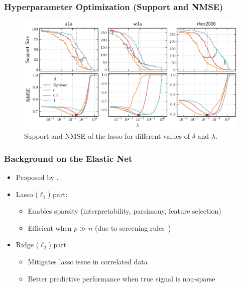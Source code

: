 \documentclass[aspectratio=1610,onlytextwidth]{beamer}
\begin{document}
\begin{frame}[c]
  \frametitle{Hyperparameter Optimization (Support and NMSE)}

  \begin{figure}[htpb]
    \centering
    \includegraphics[width=\textwidth]{figures/hyperopt_paths.pdf}
    \caption{%
      Support and NMSE of the lasso for different values of \(\delta\) and \(\lambda\).
    }
  \end{figure}
\end{frame}

\begin{frame}[c]
  \frametitle{Background on the Elastic Net}

  \begin{itemize}
    \item<1-> Proposed by \citet{zou2005}.
    \item<2-> Lasso (\(\ell_1\)) part:
          \begin{itemize}
            \item Enables sparsity (interpretability, parsimony, feature selection)
            \item Efficient when \(p \gg n\) (due to screening rules~\citep{elghaoui2010,tibshirani2012})
          \end{itemize}
    \item<3-> Ridge (\(\ell_2\)) part
          \begin{itemize}
            \item Mitigates lasso issue in correlated data
            \item Better predictive performance when true signal is non-sparse
          \end{itemize}
  \end{itemize}
\end{frame}
\end{document}
